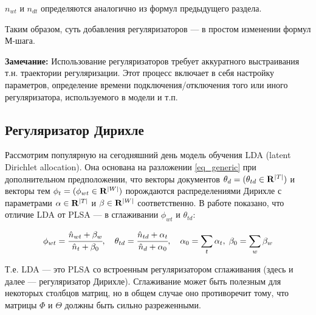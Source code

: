  	 $n_{wt}$ и $n_{dt}$ определяются аналогично из формул предыдущего раздела.
 	 
Таким образом, суть добавления регуляризаторов --- в простом изменении формул М-шага.

{\bf Замечание:} Использование регуляризаторов требует аккуратного выстраивания т.н. траектории регуляризации. Этот процесс включает в себя настройку параметров, определение времени подключения/отключения того или иного регуляризатора, используемого в модели и т.п.

\subsection{Регуляризатор Дирихле}

Рассмотрим популярную на сегодняшний день модель обучения LDA (latent Dirichlet allocation). Она основана на разложении \ref{eq_generic} при дополнительном предположении, что векторы документов $\theta_d = (\theta_{td} \in {\bf R}^{|T|})$ и векторы тем $\phi_t = (\phi_{wt} \in {\bf R}^{|W|})$ порождаются распределениями Дирихле с параметрами $\alpha \in {\bf R}^{|T|}$ и $\beta \in {\bf R}^{|W|}$ соответственно. В работе \cite{voron2013ptm} показано, что отличие LDA от PLSA --- в сглаживании $\phi_{wt}$ и $\theta_{td}$:

\begin{equation}
	\phi_{wt} = \cfrac{\hat n_{wt} + \beta_w}{\hat n_t + \beta_0}, \quad 
 	\theta_{td} = \cfrac{\hat n_{td} + \alpha_t}{\hat n_d + \alpha_0}, \quad
	\alpha_0 = \sum_t \alpha_t, \; \beta_0 = \sum_w \beta_w
\end{equation}

Т.е. LDA --- это PLSA со встроенным регуляризатором сглаживания (здесь и далее --- регуляризатор Дирихле). Сглаживание может быть полезным для некоторых столбцов матриц, но в общем случае оно противоречит тому, что матрицы $\Phi$ и $\Theta$ должны быть сильно разреженными. 